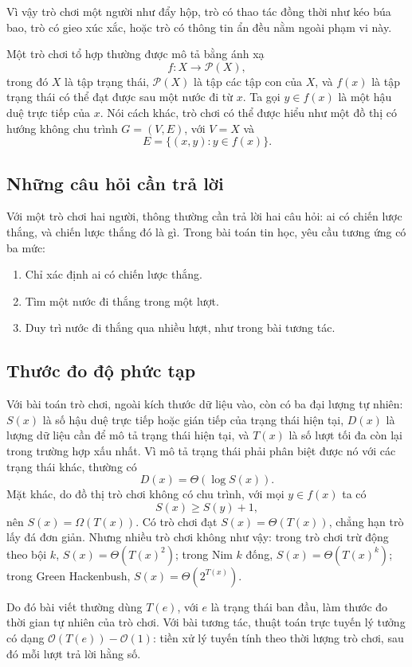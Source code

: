 \documentclass[11pt]{article}
\newcommand{\Oh}{\mathcal{O}}
\begin{document}
Vì vậy trò chơi một người như đẩy hộp, trò có thao tác đồng thời như kéo búa
bao, trò có gieo xúc xắc, hoặc trò có thông tin ẩn đều nằm ngoài phạm vi này.

Một trò chơi tổ hợp thường được mô tả bằng ánh xạ
\[
  f:X\to \mathcal{P}(X),
\]
trong đó \(X\) là tập trạng thái, \(\mathcal{P}(X)\) là tập các tập con của
\(X\), và \(f(x)\) là tập trạng thái có thể đạt được sau một nước đi từ
\(x\). Ta gọi \(y\in f(x)\) là một hậu duệ trực tiếp của \(x\). Nói cách khác,
trò chơi có thể được hiểu như một đồ thị có hướng không chu trình
\(G=(V,E)\), với \(V=X\) và
\[
  E=\{(x,y):y\in f(x)\}.
\]

\subsection{Những câu hỏi cần trả lời}

Với một trò chơi hai người, thông thường cần trả lời hai câu hỏi: ai có chiến
lược thắng, và chiến lược thắng đó là gì. Trong bài toán tin học, yêu cầu
tương ứng có ba mức:
\begin{enumerate}
  \item Chỉ xác định ai có chiến lược thắng.
  \item Tìm một nước đi thắng trong một lượt.
  \item Duy trì nước đi thắng qua nhiều lượt, như trong bài tương tác.
\end{enumerate}

\subsection{Thước đo độ phức tạp}

Với bài toán trò chơi, ngoài kích thước dữ liệu vào, còn có ba đại lượng tự
nhiên: \(S(x)\) là số hậu duệ trực tiếp hoặc gián tiếp của trạng thái hiện
tại, \(D(x)\) là lượng dữ liệu cần để mô tả trạng thái hiện tại, và \(T(x)\) là
số lượt tối đa còn lại trong trường hợp xấu nhất. Vì mô tả trạng thái phải
phân biệt được nó với các trạng thái khác, thường có
\[
  D(x)=\Theta(\log S(x)).
\]
Mặt khác, do đồ thị trò chơi không có chu trình, với mọi \(y\in f(x)\) ta có
\[
  S(x)\ge S(y)+1,
\]
nên \(S(x)=\Omega(T(x))\). Có trò chơi đạt \(S(x)=\Theta(T(x))\), chẳng hạn
trò lấy đá đơn giản. Nhưng nhiều trò chơi không như vậy: trong trò chơi trừ
động theo bội \(k\), \(S(x)=\Theta(T(x)^2)\); trong Nim \(k\) đống,
\(S(x)=\Theta(T(x)^k)\); trong Green Hackenbush,
\(S(x)=\Theta(2^{T(x)})\).

Do đó bài viết thường dùng \(T(e)\), với \(e\) là trạng thái ban đầu, làm
thước đo thời gian tự nhiên của trò chơi. Với bài tương tác, thuật toán trực
tuyến lý tưởng có dạng \(\Oh(T(e))-\Oh(1)\): tiền xử lý tuyến tính theo thời
lượng trò chơi, sau đó mỗi lượt trả lời hằng số.
\end{document}
